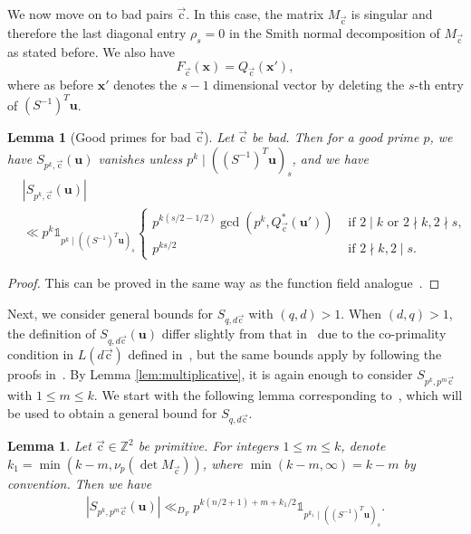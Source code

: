 \documentclass[letterpaper,11pt]{amsart}
\numberwithin{equation}{section}
\newtheorem{lemma}[theorem]{Lemma}
\theoremstyle{definition}
\numberwithin{equation}{section}
\newcommand{\ZZ}{\mathbb{Z}}
\newcommand{\x}{\mathbf{x}}
\newcommand{\uu}{\mathbf{u}}
\newcommand{\uc}{{\vec{\mathrm{c}}}}
\begin{document}
We now move on to bad pairs $\uc$. In this case, the matrix $M_\uc$ is singular and therefore the last diagonal entry $\rho_s=0$ in the Smith normal decomposition of $M_\uc$ as stated before. We also have $$F_\uc(\x)=Q_\uc(\x'),$$
where as before $\x'$ denotes the $s-1$ dimensional vector by deleting the $s$-th entry of $(S^{-1})^T\uu$.
\begin{lemma}[Good primes for bad $\uc$]\label{badc}
	Let $\uc$ be bad. Then for a good prime $p$, we have $S_{p^k,\uc}( \uu)$ vanishes unless $p^k\mid ((S^{-1})^T\uu)_s$, and we have
	\begin{align*}
	&|S_{p^k,\uc}(\uu)|\\ &\ll p^k\mathds{1}_{p^k\mid ((S^{-1})^T\uu)_s}\begin{cases}
	p^{k(s/2-1/2)}\gcd(p^{k},Q_{\uc}^*(\uu'))&\textrm{ if }2\mid k \text{ or } 2\nmid k, 2\nmid s,\\
	p^{ks/2}&\textrm{ if }2\nmid k, 2\mid s.
	\end{cases}
	\end{align*}
\end{lemma}
\begin{proof}
This can be proved in the same way as the function field analogue~\cite[Lemma~6.4]{V19}.
\end{proof}
Next, we consider general bounds for $S_{q, d\uc}$ with $(q, d)>1$. When $(d, q)>1$, the definition of $S_{q, d\uc}(\uu)$ differ slightly from that in~\cite[Section 6]{V19} due to the co-primality condition in $L(d\uc)$ defined in~\cite{V19}, but the same bounds apply by following the proofs in~\cite[Lemma 6.5, Lemma 6.7]{V19}. By Lemma \ref{lem:multiplicative}, it is again enough to consider $S_{p^k, p^m \uc}$ with $1\leq m \leq k.$ We start with the following lemma corresponding to~\cite[Lemma 6.7]{V19}, which will be used to obtain a general bound for $S_{q, d\uc}$.
\begin{lemma}\label{lem:Spkpm}
	Let $\uc\in \ZZ^2$ be primitive. For integers $1\leq m\leq k$, denote $k_1=\min(k-m, \nu_p(\det M_{\uc}))$, where $\min(k-m,\infty)=k-m$ by convention. Then we have 
	\begin{align*}
	|S_{p^k, p^m\uc}(\uu)|\ll_{D_F} p^{k(n/2+1)+m+k_1/2}\mathds{1}_{p^{k_1}\mid ((S^{-1})^T\uu)_s}.
	\end{align*}
\end{lemma}
\end{document}
